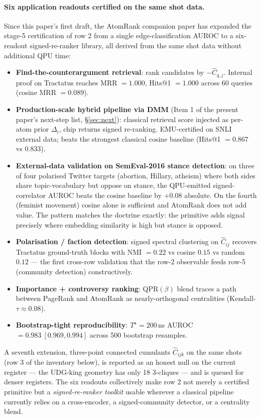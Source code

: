 \documentclass[10pt]{article}
\begin{document}
\paragraph{Six application readouts certified on the same shot data.}
Since this paper's first draft, the AtomRank companion paper \cite{jurczak2026atomrank} has expanded the stage-5 certification of row 2 from a single edge-classification AUROC to a six-readout signed-re-ranker library, all derived from the same shot data without additional QPU time:
\begin{itemize}[leftmargin=1.4em, itemsep=0.15em, topsep=0.2em]
\item \textbf{Find-the-counterargument retrieval}: rank candidates by $-\hat C_{q,j}$. Internal proof on Tractatus reaches MRR $= 1.000$, Hits@1 $= 1.000$ across 60 queries (cosine MRR $= 0.089$).
\item \textbf{Production-scale hybrid pipeline via DMM} (Item 1 of the present paper's next-step list, \S\ref{sec:next}): classical retrieval score injected as per-atom prior $\Delta_i$, chip returns signed re-ranking. EMU-certified on SNLI external data; beats the strongest classical cosine baseline (Hits@1 $= 0.867$ vs $0.833$).
\item \textbf{External-data validation on SemEval-2016 stance detection}: on three of four polarised Twitter targets (abortion, Hillary, atheism) where both sides share topic-vocabulary but oppose on stance, the QPU-emitted signed-correlator AUROC beats the cosine baseline by $+0.08$ absolute. On the fourth (feminist movement) cosine alone is sufficient and AtomRank does not add value. The pattern matches the doctrine exactly: the primitive adds signal precisely where embedding similarity is high but stance is opposed.
\item \textbf{Polarisation / faction detection}: signed spectral clustering on $\hat C_{ij}$ recovers Tractatus ground-truth blocks with NMI $= 0.22$ vs cosine $0.15$ vs random $0.12$ --- the first cross-row validation that the row-2 observable feeds row-5 (community detection) constructively.
\item \textbf{Importance + controversy ranking}: QPR$(\beta)$ blend traces a path between PageRank and AtomRank as nearly-orthogonal centralities (Kendall-$\tau \approx 0.08$).
\item \textbf{Bootstrap-tight reproducibility}: $T^\star = 200\,$ns AUROC $= 0.983\ [0.969, 0.994]$ across 500 bootstrap resamples.
\end{itemize}
A seventh extension, three-point connected cumulants $\hat C_{ijk}$ on the same shots (row 3 of the inventory below), is reported as an honest null on the current register --- the UDG-king geometry has only 18 3-cliques --- and is queued for denser registers. The six readouts collectively make row 2 not merely a certified primitive but a \emph{signed-re-ranker toolkit} usable wherever a classical pipeline currently relies on a cross-encoder, a signed-community detector, or a centrality blend.
\end{document}
